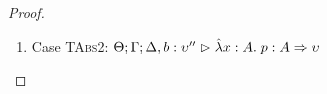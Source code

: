 \begin{proof}
\begin{enumerate}
  First, the syntax:
  \begin{tabbedproof}
    \oo By inversion, $\judgeA[\Theta; \Gamma; \Delta, b:\upsilon'', u:\upsilon']{p}{\upsilon}$ \\
    \oo By induction, $\judgeA[\Theta; \Gamma; \Delta, u:\upsilon']{[r/b]p}{\upsilon}$ \\
    \oo By rule, $\judgeA[\Theta; \Gamma; \Delta]{\pfun{u}{\upsilon'}{[r/b]p}}{\upsilon' \To \upsilon}$ \\
    \oo By def of subst, $\judgeA[\Theta; \Gamma; \Delta]{[r/b](\pfun{u}{\upsilon'}{p})}{\upsilon' \To \upsilon}$ \\
  \end{tabbedproof}
  For semantics, consider $\interp{\judgeA[\Theta; \Gamma; \Delta]{(\pfun{u}{\upsilon'}{[r/b]p})}{\upsilon' \To \upsilon}}\;\theta\;\gamma\;\delta$ \\
  \begin{eqnproof}
          {Semantics}
          {Induction}
          {Semantics}
  \end{eqnproof}

\item Case \textsc{TAbs2}: $\judgeA[\Theta; \Gamma; \Delta, b:\upsilon'']{\pfun{x}{A}{p}}{A \To \upsilon}$
  

\end{enumerate}
\end{proof}
